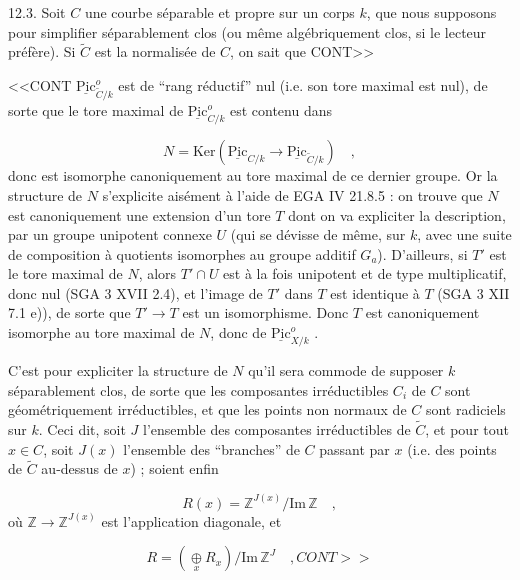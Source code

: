 12.3. Soit $C$ une courbe séparable et propre sur un corps $k$, que nous supposons pour simplifier séparablement clos (ou même algébriquement clos, si le lecteur préfère). Si $\widetilde{C}$ est la normalisée de $C$, on sait que CONT>>



<<CONT $\underline{\mathrm{Pic}}^o_{\widetilde{C}/k}$ est de ``rang réductif'' nul (i.e. son tore maximal est nul), de sorte que le tore maximal de $\underline{\mathrm{Pic}}^o_{C/k}$ est contenu dans

\begin{equation*}
N = \mathrm{Ker}(\underline{\mathrm{Pic}}_{C/k} \longrightarrow \underline{\mathrm{Pic}}_{\widetilde{C}/k}) \quad ,
\end{equation*}
donc est isomorphe canoniquement au tore maximal de ce dernier groupe. Or la structure de $N$ s'explicite aisément à l'aide de EGA IV 21.8.5 : on trouve que $N$ est canoniquement une extension d'un tore $T$ dont on va expliciter la description, par un groupe unipotent connexe $U$ (qui se dévisse de même, sur $k$, avec une suite de composition à quotients isomorphes au groupe additif $G_a$). D'ailleurs, si $T'$ est le tore maximal de $N$, alors $T' \cap U$ est à la fois unipotent et de type multiplicatif, donc nul (SGA 3 XVII 2.4), et l'image de $T'$ dans $T$ est identique à $T$ (SGA 3 XII 7.1 e)), de sorte que $T' \longrightarrow T$ est un isomorphisme. Donc $T$ est canoniquement isomorphe au tore maximal de $N$, donc de $\underline{\mathrm{Pic}}^o_{X/k}$ .

C'est pour expliciter la structure de $N$ qu'il sera commode de supposer $k$ séparablement clos, de sorte que les composantes irréductibles $C_i$ de $C$ sont géométriquement irréductibles, et que les points non normaux de $C$ sont radiciels sur $k$. Ceci dit, soit $J$ l'ensemble des composantes irréductibles de $\widetilde{C}$, et pour tout $x \in C$, soit $J(x)$ l'ensemble des ``branches'' de $C$ passant par $x$ (i.e. des points de $\widetilde{C}$ au-dessus de $x$) ; soient enfin

\begin{equation}\tag{12.3.1}
R(x) = \mathbb{Z}^{J(x)}/\mathrm{Im}\,\mathbb{Z} \quad ,
\end{equation}
où $\mathbb{Z} \longrightarrow \mathbb{Z}^{J(x)}$ est l'application diagonale, et

\begin{equation}\tag{12.3.2}
R = (\mathop{\oplus}\limits_{x} R_x)/\mathrm{Im}\,\mathbb{Z}^J \quad , CONT>>
\end{equation}

